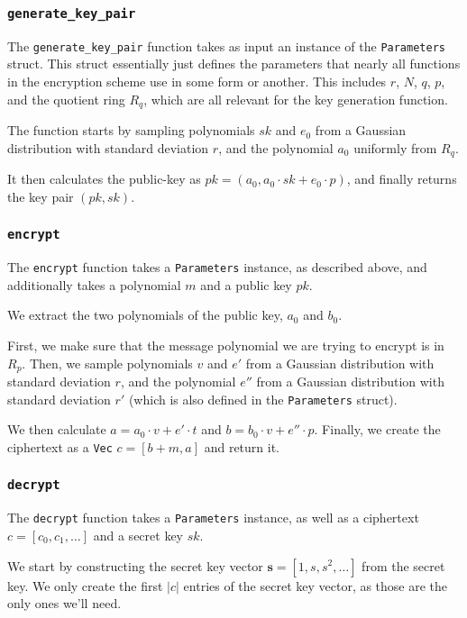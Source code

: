 \documentclass[../main.tex]{subfiles}
\begin{document}
\subsubsection{\lstinline{generate_key_pair}}

The \lstinline{generate_key_pair} function takes as input an instance of the \lstinline{Parameters} struct.
This struct essentially just defines the parameters that nearly all functions in the encryption scheme use in some form or another.
This includes $r$, $N$, $q$, $p$, and the quotient ring $R_q$, which are all relevant for the key generation function.

The function starts by sampling polynomials $sk$ and $e_0$ from a Gaussian distribution with standard deviation $r$, and the polynomial $a_0$ uniformly from $R_q$.

It then calculates the public-key as $pk = (a_0, a_0 \cdot sk + e_0 \cdot p)$, and finally returns the key pair $(pk, sk)$.

\subsubsection{\lstinline{encrypt}}

The \lstinline{encrypt} function takes a \lstinline{Parameters} instance, as described above, and additionally takes a polynomial $m$ and a public key $pk$.

We extract the two polynomials of the public key, $a_0$ and $b_0$.

First, we make sure that the message polynomial we are trying to encrypt is in $R_p$.
Then, we sample polynomials $v$ and $e'$ from a Gaussian distribution with standard deviation $r$, and the polynomial $e''$ from a Gaussian distribution with standard deviation $r'$ (which is also defined in the \lstinline{Parameters} struct).

We then calculate $a = a_0 \cdot v + e' \cdot t$ and $b = b_0 \cdot v + e'' \cdot p$.
Finally, we create the ciphertext as a \lstinline{Vec} $c = [b + m, a]$ and return it.

\subsubsection{\lstinline{decrypt}}

The \lstinline{decrypt} function takes a \lstinline{Parameters} instance, as well as a ciphertext $c = [c_0, c_1, \dots]$ and a secret key $sk$.

We start by constructing the secret key vector $\mathbf{s} = [1, s, s^2, \dots]$ from the secret key.
We only create the first $|c|$ entries of the secret key vector, as those are the only ones we'll need.
\end{document}
